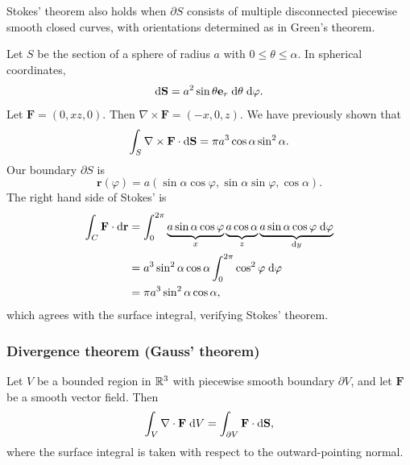 \documentclass[a4paper]{article}
\begin{document}
\begin{rmk}
  Stokes' theorem also holds when $\partial S$ consists of multiple disconnected piecewise smooth closed curves, with orientations determined as in Green's theorem.
\end{rmk}

\begin{eg}
  Let $S$ be the section of a sphere of radius $a$ with $0 \leq \theta \leq \alpha$. In spherical coordinates,
  \[
    \mathrm{d} \mathbf{S} = a^2 \sin \theta \mathbf{e}_r \;\mathrm{d} \theta\;\mathrm{d} \varphi.
  \]
  Let $\mathbf{F} = (0, xz, 0)$. Then $\nabla \times \mathbf{F} = (-x, 0, z)$. We have previously shown that
  \[
    \int_S \nabla\times \mathbf{F}\cdot \mathrm{d} \mathbf{S} = \pi a^3 \cos\alpha\sin^2 \alpha.
  \]
  Our boundary $\partial S$ is
  \[
    \mathbf{r}(\varphi) = a(\sin \alpha\cos \varphi, \sin \alpha\sin \varphi, \cos \alpha).
  \]
  The right hand side of Stokes' is
  \begin{align*}
    \int_C \mathbf{F}\cdot \mathrm{d} \mathbf{r} &= \int_0^{2\pi}\underbrace{a\sin \alpha\cos \varphi}_{x}\underbrace{\vphantom{\varphi}a\cos\alpha}_z \underbrace{a\sin \alpha\cos\varphi\;\mathrm{d} \varphi}_{\mathrm{d} y}\\
    &= a^3\sin^2\alpha\cos\alpha\int_0^{2\pi}\cos^2\varphi\;\mathrm{d} \varphi\\
    &= \pi a^3\sin^2\alpha\cos\alpha,
  \end{align*}
  which agrees with the surface integral, verifying Stokes' theorem.
\end{eg}

\subsubsection{Divergence theorem (Gauss' theorem)}
\begin{thm}
  Let $V$ be a bounded region in $\mathbb{R}^3$ with piecewise smooth boundary $\partial V$, and let $\mathbf{F}$ be a smooth vector field. Then
  \[
    \int _V \nabla\cdot \mathbf{F}\;\mathrm{d} V = \int_{\partial V}\mathbf{F}\cdot \mathrm{d} \mathbf{S},
  \]
  where the surface integral is taken with respect to the outward-pointing normal.
\end{thm}
\end{document}
